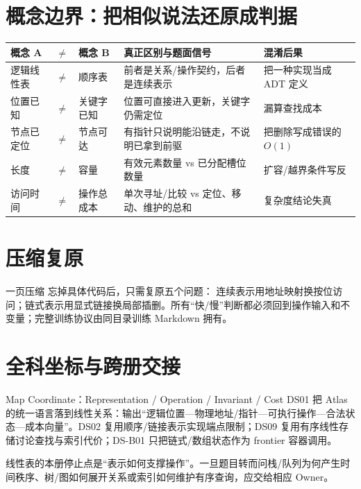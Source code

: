 \documentclass[UTF8,fontset=none,11pt,a4paper]{ctexart}
\begin{document}
\section{概念边界：把相似说法还原成判据}
\begin{center}\small
\begin{tabularx}{\linewidth}{L{1.8cm}C{0.35cm}L{1.8cm}Y Y}
\toprule
概念 A & $\neq$ & 概念 B & 真正区别与题面信号 & 混淆后果\\
\midrule
逻辑线性表 & $\neq$ & 顺序表 & 前者是关系/操作契约，后者是连续表示 & 把一种实现当成 ADT 定义\\
位置已知 & $\neq$ & 关键字已知 & 位置可直接进入更新，关键字仍需定位 & 漏算查找成本\\
节点已定位 & $\neq$ & 节点可达 & 有指针只说明能沿链走，不说明已拿到前驱 & 把删除写成错误的 $O(1)$\\
长度 & $\neq$ & 容量 & 有效元素数量 vs 已分配槽位数量 & 扩容/越界条件写反\\
访问时间 & $\neq$ & 操作总成本 & 单次寻址/比较 vs 定位、移动、维护的总和 & 复杂度结论失真\\
\bottomrule
\end{tabularx}\end{center}

\section{压缩复原}
\begin{corebox}{一页压缩}
忘掉具体代码后，只需复原五个问题：
连续表示用地址映射换按位访问；链式表示用显式链接换局部插删。所有“快/慢”判断都必须回到操作输入和不变量；完整训练协议由同目录训练 Markdown 拥有。
\end{corebox}

\section{全科坐标与跨册交接}
\begin{corebox}{Map Coordinate：Representation / Operation / Invariant / Cost}
DS01 把 Atlas 的统一语言落到线性关系：输出“逻辑位置—物理地址/指针—可执行操作—合法状态—成本向量”。DS02 复用顺序/链接表示实现端点限制；DS09 复用有序线性存储讨论查找与索引代价；DS-B01 只把链式/数组状态作为 frontier 容器调用。
\end{corebox}
线性表的本册停止点是“表示如何支撑操作”。一旦题目转而问栈/队列为何产生时间秩序、树/图如何展开关系或索引如何维护有序查询，应交给相应 Owner。
\end{document}
